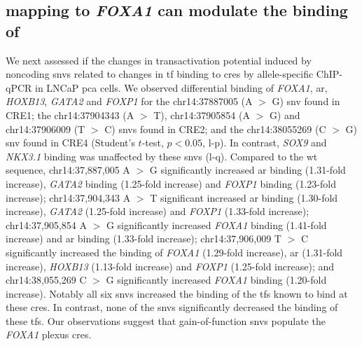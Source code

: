 \subsection{ mapping to \emph{FOXA1}  can modulate the binding of }

We next assessed if the changes in transactivation potential induced by noncoding \glspl{snv} related to changes in \gls{tf} binding to \glspl{cre} by allele-specific ChIP-qPCR \cite{baileyNoncodingSomaticInherited2016,zhangIntegrativeFunctionalGenomics2012,cowper-sal*lariBreastCancerRisk2012} in LNCaP \gls{pca} cells.
We observed differential binding of \emph{FOXA1}, \gls{ar}, \emph{HOXB13}, \emph{GATA2} and \emph{FOXP1} for the chr14:37887005 (A $>$ G) \gls{snv} found in CRE1; the chr14:37904343 (A $>$ T), chr14:37905854 (A $>$ G) and chr14:37906009 (T $>$ C) \glspl{snv} found in CRE2; and the chr14:38055269 (C $>$ G) \gls{snv} found in CRE4 (Student's $t$-test, $p<0.05$, l-p).
In contrast, \emph{SOX9} and \emph{NKX3.1} binding was unaffected by these \glspl{snv} (l-q).
Compared to the \gls{wt} sequence, chr14:37,887,005 A $>$ G significantly increased \gls{ar} binding (1.31-fold increase), \emph{GATA2} binding (1.25-fold increase) and \emph{FOXP1} binding (1.23-fold increase); chr14:37,904,343 A $>$ T significant increased \gls{ar} binding (1.30-fold increase), \emph{GATA2} (1.25-fold increase) and \emph{FOXP1} (1.33-fold increase); chr14:37,905,854 A $>$ G significantly increased \emph{FOXA1} binding (1.41-fold increase) and \gls{ar} binding (1.33-fold increase); chr14:37,906,009 T $>$ C significantly increased the binding of \emph{FOXA1} (1.29-fold increase), \gls{ar} (1.31-fold increase), \emph{HOXB13} (1.13-fold increase) and \emph{FOXP1} (1.25-fold increase); and chr14:38,055,269 C $>$ G significantly increased \emph{FOXA1} binding (1.20-fold increase).
Notably all six \glspl{snv} increased the binding of the \glspl{tf} known to bind at these \glspl{cre}.
In contrast, none of the \glspl{snv} significantly decreased the binding of these \glspl{tf}.
Our observations suggest that gain-of-function \glspl{snv} populate the \emph{FOXA1} plexus \glspl{cre}.
